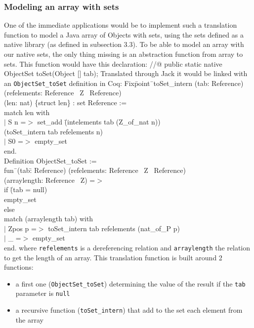 \subsubsection{Modeling an array with sets}
One of the immediate applications would be to implement such a translation function to 
model a Java array of Objects with sets, using the sets defined as a native library 
(as defined in subsection 3.3).
To be able to model an array with our native sets, the only thing missing is
an abstraction function from array to sets. This function would have this declaration:
\btab
//@ public static native ObjectSet toSet(Object [] tab);
\etab
Translated through Jack it would be linked with an {\tt ObjectSet\_toSet} definition in Coq:
\btab
Fix\=point\= \ toSet\_intern (tab: Reference)\\ 
\>(refelements: Reference \rarrow \ Z  \rarrow \ Reference)\+\\
\>(len: nat) \{struct len\} : set Reference :=\\
match len with\\
$|$ S n =$>$ set\_add \=(intelements tab (Z\_of\_nat n)) \\\>(toSet\_intern tab refelements n)\\
$|$ S0 =$>$ empty\_set\\
end.\-\\
Definition ObjectSet\_toSet :=\+\\ 
fun\= \ (tab\=: Reference) 
(refelements: Reference \rarrow \ Z  \rarrow \ Reference) \+\\ \>
(arraylength: Reference \rarrow \ Z) =$>$ \\
if \=(tab = null)\\
 \> empty\_set\\
  else \+\\
match (arraylength tab) with\\
$|$ Zpos p =$>$ toSet\_intern tab refelements (nat\_of\_P p)\\
$|$ \_ =$>$ empty\_set\\
end.
\etab
where {\tt refelements} is a dereferencing relation and {\tt arraylength} the relation to get the length of an array. This translation function is built around 2 functions:
\begin{itemize}
\item a first one ({\tt ObjectSet\_toSet}) determining the value of the result if the {\tt tab} parameter is {\tt null} 
\item a recursive function ({\tt toSet\_intern}) that add to the set each element from the array
\end{itemize}

